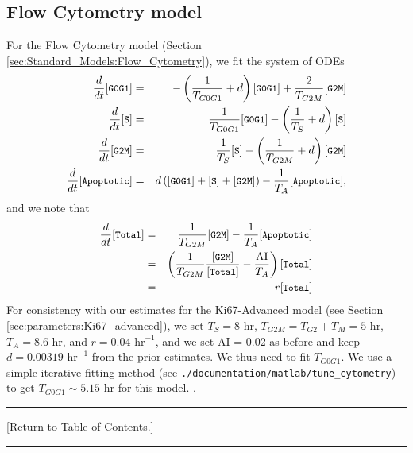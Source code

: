 \documentclass[12pt]{article}
\newcommand{\beqa}{\begin{eqnarray}}
\newcommand{\eeqa}{\end{eqnarray}}
\renewcommand{\v}{\verb}
\renewcommand{\tt}[1]{{\small \left[\texttt{#1}\right] }}
\newcommand{\TOClink}{\begin{center}\hrule\vskip-10pt\phantom{.}\hfill[Return to \hyperlink{TOC}{Table of Contents}.]\hfill\phantom{.}\vskip3pt\hrule\end{center}}
\begin{document}
\subsection{Flow Cytometry model}
\label{sec:parameters:flow_cytometry}
For the Flow Cytometry model (Section \ref{sec:Standard_Models:Flow_Cytometry}), 
we fit the system of ODEs 
\beqa
\frac{d}{dt}\tt{G0G1} & = & -\left( \frac{1}{T_{G0G1}} + d \right) \tt{G0G1} + \frac{2}{T_{G2M}}\tt{G2M}  \\
\frac{d}{dt}\tt{S} & = & \frac{1}{T_{G0G1}} \tt{G0G1} - \left( \frac{1}{T_{S}} + d \right) \tt{S} \\
\frac{d}{dt}\tt{G2M} & = &  \frac{1}{T_{S}} \tt{S} - \left( \frac{1}{T_{G2M}} + d \right) \tt{G2M} \\
\frac{d}{dt}\tt{Apoptotic} & = & d\left( \tt{G0G1} + \tt{S} + \tt{G2M} \right) -\frac{1}{T_A} \tt{Apoptotic}, 
\eeqa
and we note that 
\beqa
\frac{d}{dt}\tt{Total} 
& = & \frac{1}{T_{G2M}} \tt{G2M} - \frac{1}{T_A} \tt{Apoptotic} \nonumber \\ 
& = & \left( \frac{1}{T_{G2M}} \frac{\tt{G2M}}{\tt{Total}} - \frac{\textrm{AI}}{T_A} \right) \tt{Total} \nonumber \\ 
& = & r \tt{Total} 
\eeqa
For consistency with our estimates for the Ki67-Advanced model (see Section \ref{sec:parameters:Ki67_advanced}), 
we set $T_{S} = 8$ hr, $T_{G2M} = T_{G2} + T_{M} = 5$ hr, $T_A = 8.6$ hr, and 
$r = 0.04 \textrm{ hr}^{-1}$, and we set AI = 0.02 as before and keep 
$d = 0.00319 \textrm{ hr}^{-1}$ from the prior estimates. We thus need to fit  
$T_{G0G1}$. We use a simple iterative fitting method 
(see \v|./documentation/matlab/tune_cytometry|) to get $T_{G0G1} \sim 5.15 \textrm{ hr}$ for this model. 
\cite{ref:Ki67_MCF10A}. 

\TOClink 
\end{document}
